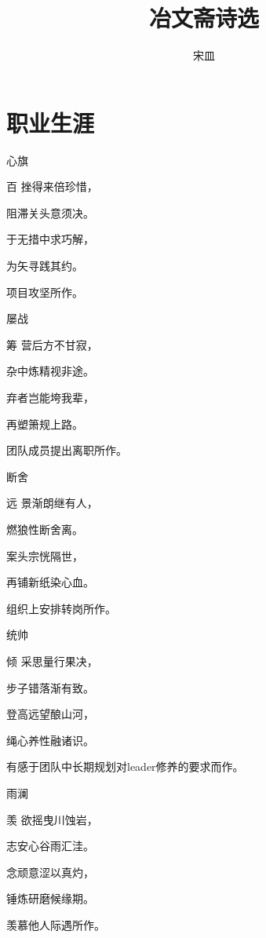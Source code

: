 \documentclass{article}
\title{冶文斋诗选}
\author{宋皿}
\date{\DTMtoday}
\newenvironment{poem}[3]{
\begin{minipage}{\textwidth}
\begin{pinyinscope}\begin{center}\Large\linespread{1.4}\selectfont #2\end{center}\end{pinyinscope}
\begin{pinyinscope}
	\begin{center}
	\Large\linespread{1.4}\rmfamily\selectfont #3
}{\end{center}
\end{pinyinscope}
\end{minipage}
}
\begin{document}
\maketitle
\thispagestyle{empty}
\setcounter{page}{0}
\newpage

\section{职业生涯}

\begin{poem}{}{心旗}
百挫得来倍珍惜，

阻滞关头意须决。

于无措中求巧解，

为矢寻{}践其约。
\end{poem}

项目攻坚所作。

\begin{poem}{}{屡战}
筹营后方不甘寂，

杂中炼精视非途。

弃者岂能垮我辈，

再塑箫规{}上路。
\end{poem}

团队成员提出离职所作。

\begin{poem}{}{断舍}
远景渐朗继有人，

{}燃狼性断舍离。

案头宗{}恍隔世，

再铺新纸染心血。
\end{poem}

组织上安排转岗所作。

\begin{poem}{}{统帅}
倾采思量行果决，

步子错落渐有致。

登高远望酿山河，

绳心养性融诸识。
\end{poem}

有感于团队中长期规划对leader修养的要求而作。

\begin{poem}{}{雨澜}
羡欲摇曳川蚀岩，

志安心谷雨汇洼。

念顽意涩以真灼，

锤炼研磨候缘期。
\end{poem}

羡慕他人际遇所作。
\end{document}
